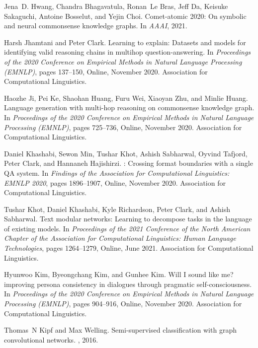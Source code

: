 \documentclass[11pt]{article}
\begin{document}
\begin{thebibliography}{100}
Jena~D. Hwang, Chandra Bhagavatula, Ronan~Le Bras, Jeff Da, Keisuke Sakaguchi,
  Antoine Bosselut, and Yejin Choi.
\newblock Comet-atomic 2020: On symbolic and neural commonsense knowledge
  graphs.
\newblock In {\em AAAI}, 2021.

Harsh Jhamtani and Peter Clark.
\newblock Learning to explain: Datasets and models for identifying valid
  reasoning chains in multihop question-answering.
\newblock In {\em Proceedings of the 2020 Conference on Empirical Methods in
  Natural Language Processing (EMNLP)}, pages 137--150, Online, November 2020.
  Association for Computational Linguistics.

Haozhe Ji, Pei Ke, Shaohan Huang, Furu Wei, Xiaoyan Zhu, and Minlie Huang.
\newblock Language generation with multi-hop reasoning on commonsense knowledge
  graph.
\newblock In {\em Proceedings of the 2020 Conference on Empirical Methods in
  Natural Language Processing (EMNLP)}, pages 725--736, Online, November 2020.
  Association for Computational Linguistics.

Daniel Khashabi, Sewon Min, Tushar Khot, Ashish Sabharwal, Oyvind Tafjord,
  Peter Clark, and Hannaneh Hajishirzi.
: Crossing format boundaries with a single {QA} system.
\newblock In {\em Findings of the Association for Computational Linguistics:
  EMNLP 2020}, pages 1896--1907, Online, November 2020. Association for
  Computational Linguistics.

Tushar Khot, Daniel Khashabi, Kyle Richardson, Peter Clark, and Ashish
  Sabharwal.
\newblock Text modular networks: Learning to decompose tasks in the language of
  existing models.
\newblock In {\em Proceedings of the 2021 Conference of the North American
  Chapter of the Association for Computational Linguistics: Human Language
  Technologies}, pages 1264--1279, Online, June 2021. Association for
  Computational Linguistics.

Hyunwoo Kim, Byeongchang Kim, and Gunhee Kim.
\newblock Will {I} sound like me? improving persona consistency in dialogues
  through pragmatic self-consciousness.
\newblock In {\em Proceedings of the 2020 Conference on Empirical Methods in
  Natural Language Processing (EMNLP)}, pages 904--916, Online, November 2020.
  Association for Computational Linguistics.

Thomas~N Kipf and Max Welling.
\newblock Semi-supervised classification with graph convolutional networks.
, 2016.


\end{thebibliography}
\end{document}
